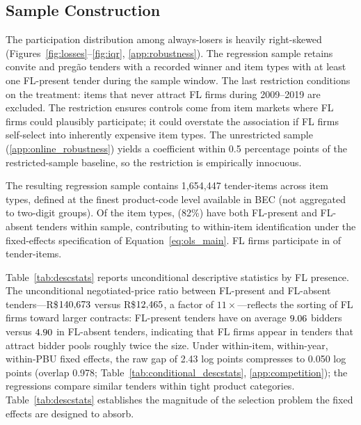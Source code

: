 \subsection{Sample Construction}
\label{sec:sample}

The participation distribution among always-losers is heavily
right-skewed (Figures~\ref{fig:losses}--\ref{fig:iqr},
\ref{app:robustness}). The regression sample retains convite
and preg\~ao tenders with a recorded winner and item types with
at least one FL-present tender during the sample window. The
last restriction conditions on the treatment: items that never
attract FL firms during 2009--2019 are excluded. The
restriction ensures controls come from item markets where FL
firms could plausibly participate; it could overstate the
association if FL firms self-select into inherently
expensive item types. The unrestricted sample
(\ref{app:online_robustness}) yields a coefficient
within 0.5 percentage points of the restricted-sample baseline,
so the restriction is empirically innocuous.

The resulting regression sample contains 1,654,447
tender-items across \valFirmCount item types, defined at the finest
product-code level available in BEC (not aggregated to
two-digit groups). Of the \valFirmCount item types, \valDataFirmMean (82\%)
have both FL-present and FL-absent tenders within sample,
contributing to within-item identification under the
fixed-effects specification of
Equation~\ref{eq:ols_main}. FL firms participate in \valCartelMarkup of
tender-items.

Table~\ref{tab:descstats} reports unconditional descriptive
statistics by FL presence. The unconditional negotiated-price
ratio between FL-present and FL-absent tenders---R\$$140{,}673$
versus R\$$12{,}465$, a factor of $11\times$---reflects the
sorting of FL firms toward larger contracts: FL-present tenders
have on average $9.06$ bidders versus $4.90$ in FL-absent
tenders, indicating that FL firms appear in tenders that
attract bidder pools roughly twice the size. Under
within-item, within-year, within-PBU fixed effects, the raw
gap of 2.43 log points compresses to 0.050 log points (overlap
0.978; Table~\ref{tab:conditional_descstats},
\ref{app:competition}); the regressions
compare similar tenders within tight product categories.
Table~\ref{tab:descstats} establishes the magnitude of the
selection problem the fixed effects are designed to absorb.



